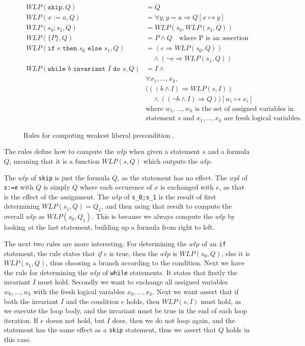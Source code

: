 \begin{figure}[h!]
\begin{align*}
WLP(\texttt{skip}, Q) &= Q \\
WLP(x:=a,Q) &= \forall y, y = a \Rightarrow Q[x \mapsto y] \\
WLP(s_0;s_1, Q) &= WLP(s_0, WLP(s_1, Q)) \\
WLP(\{P\}, Q) &= P \land Q \quad \text{where P is an assertion} \\
WLP(\texttt{if } e \texttt{ then } s_0 \texttt{ else } s_1, Q) &= (e \Rightarrow WLP(s_0, Q)) \\
    &\quad \land (\neg e \Rightarrow WLP(s_1, Q)) \\
WLP(\texttt{while } b \texttt{ invariant } I \texttt{ do } s, Q) &=
    I \land \\
&\forall x_1, ..., x_k, \\
&(((b \land I) \Rightarrow WLP(s, I)) \\
&\quad \land (( \neg b \land I) \Rightarrow Q))
    [w_i \mapsto x_i] \\
&\text{where } w_1, ..., w_k \text{ is the set of assigned variables in} \\
&\text{statement } s \text{ and } x_1, ..., x_k \text{ are fresh logical variables.}
\end{align*}
\caption{Rules for computing weakest liberal precondition \cite{wlp}.}
\label{fig:wlp}
\end{figure}

The rules define how to compute the $wlp$ when given a statement $s$ and a formula $Q$, meaning that it is a function $WLP(s,Q)$ which outputs the $wlp$.

The $wlp$ of \texttt{skip} is just the formula $Q$, as the statement has no effect.
The $wpl$ of \texttt{x:=e} with $Q$ is simply $Q$ where each occurence of $x$ is exchanged with $e$, as that is the effect of the assignment.
The $wlp$ of \texttt{s_0;s_1} is the result of first determining $WLP(s_{1},Q) = Q_{1}$, and then using that result to compute the overall $wlp$ as $WLP(s_{0}, Q_{1})$. This is because we always compute the $wlp$ by looking at the last statement, building up a formula from right to left.

The next two rules are more interesting.
For determining the $wlp$ of an \texttt{if} statement, the rule states that \textit{if} $e$ is true, then the $wlp$ is $WLP(s_{0}, Q)$, else it is $WLP(s_{1},Q)$, thus choosing a branch according to the condition.
Next we have the rule for determining the $wlp$ of \texttt{while} statements.
It states that firstly the invariant $I$ must hold. Secondly we want to exchange all assigned variables $w_{0},...,w_{k}$ with the fresh logical variables $x_{0},...,x_{k}$. Next we want assert that if both the invariant $I$ and the condition $e$ holds, then $WLP(s, I)$ must hold, as we execute the loop body, and the invariant must be true in the end of each loop iteration. If $e$ doesn not hold, but $I$ does, then we do not loop again, and the statement has the same effect as a \texttt{skip} statement, thus we assert that $Q$ holds in this case.


